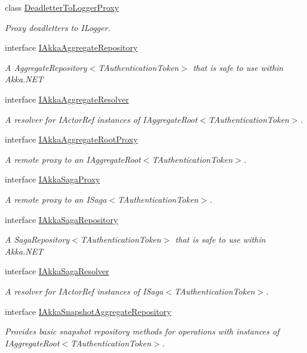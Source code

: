 \begin{DoxyCompactItemize}
class \hyperlink{classCqrs_1_1Akka_1_1Domain_1_1DeadletterToLoggerProxy}{Deadletter\+To\+Logger\+Proxy}
\begin{DoxyCompactList}\small\item\em Proxy deadletters to I\+Logger. \end{DoxyCompactList}\item 
interface \hyperlink{interfaceCqrs_1_1Akka_1_1Domain_1_1IAkkaAggregateRepository}{I\+Akka\+Aggregate\+Repository}
\begin{DoxyCompactList}\small\item\em A Aggregate\+Repository$<$\+T\+Authentication\+Token$>$ that is safe to use within Akka.\+N\+ET \end{DoxyCompactList}\item 
interface \hyperlink{interfaceCqrs_1_1Akka_1_1Domain_1_1IAkkaAggregateResolver}{I\+Akka\+Aggregate\+Resolver}
\begin{DoxyCompactList}\small\item\em A resolver for I\+Actor\+Ref instances of I\+Aggregate\+Root$<$\+T\+Authentication\+Token$>$. \end{DoxyCompactList}\item 
interface \hyperlink{interfaceCqrs_1_1Akka_1_1Domain_1_1IAkkaAggregateRootProxy}{I\+Akka\+Aggregate\+Root\+Proxy}
\begin{DoxyCompactList}\small\item\em A remote proxy to an I\+Aggregate\+Root$<$\+T\+Authentication\+Token$>$. \end{DoxyCompactList}\item 
interface \hyperlink{interfaceCqrs_1_1Akka_1_1Domain_1_1IAkkaSagaProxy}{I\+Akka\+Saga\+Proxy}
\begin{DoxyCompactList}\small\item\em A remote proxy to an I\+Saga$<$\+T\+Authentication\+Token$>$. \end{DoxyCompactList}\item 
interface \hyperlink{interfaceCqrs_1_1Akka_1_1Domain_1_1IAkkaSagaRepository}{I\+Akka\+Saga\+Repository}
\begin{DoxyCompactList}\small\item\em A Saga\+Repository$<$\+T\+Authentication\+Token$>$ that is safe to use within Akka.\+N\+ET \end{DoxyCompactList}\item 
interface \hyperlink{interfaceCqrs_1_1Akka_1_1Domain_1_1IAkkaSagaResolver}{I\+Akka\+Saga\+Resolver}
\begin{DoxyCompactList}\small\item\em A resolver for I\+Actor\+Ref instances of I\+Saga$<$\+T\+Authentication\+Token$>$. \end{DoxyCompactList}\item 
interface \hyperlink{interfaceCqrs_1_1Akka_1_1Domain_1_1IAkkaSnapshotAggregateRepository}{I\+Akka\+Snapshot\+Aggregate\+Repository}
\begin{DoxyCompactList}\small\item\em Provides basic snapshot repository methods for operations with instances of I\+Aggregate\+Root$<$\+T\+Authentication\+Token$>$. \end{DoxyCompactList}\end{DoxyCompactItemize}
